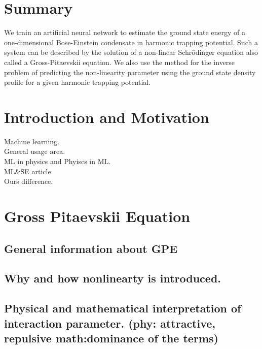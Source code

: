 \documentclass[a4paper,times,12pt]{article}
\begin{document}
\setcounter{page}{1}

\section*{Summary}

We train an artificial neural network to estimate the ground state energy
of a one-dimensional Bose-Einstein condensate in harmonic trapping potential.
Such a system can be described by the solution of a non-linear Schr{\"o}dinger equation also called a Gross-Pitaevskii equation. We also use the method for the inverse problem of predicting the non-linearity parameter using the ground
state density profile for a given harmonic trapping potential.

\newpage
\tableofcontents

\newpage

\section{Introduction and Motivation}
\label{sec:Intro}
\noindent Machine learning.\\
General usage area.\\
ML in physics and Phyiscs in ML.\\
ML\&SE article.\\
Ours difference.\\

\section{Gross Pitaevskii Equation}
\subsection{General information about GPE}
\subsection{Why and how nonlinearty is introduced.}
\subsection{Physical and mathematical interpretation of interaction parameter. (phy: attractive, repulsive  math:dominance of the terms)}
\end{document}
